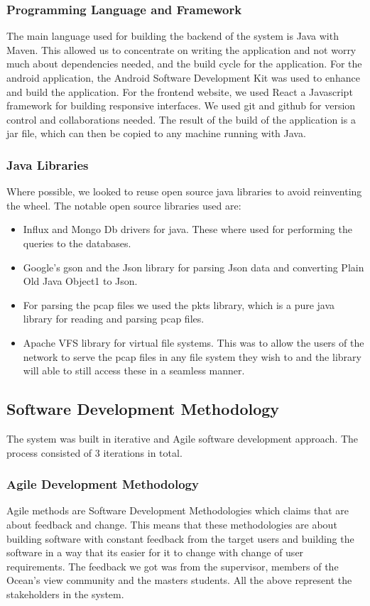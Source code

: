 \subsubsection{Programming Language and Framework}
The main language used for building the backend of the system is Java with Maven.
This allowed us to concentrate on writing the application and not worry much about dependencies needed, and the build cycle for the application.
For the android application, the Android Software Development Kit was used to enhance and build the application.
For the frontend website, we used React a Javascript framework for building responsive interfaces.
We used git and github for version control and collaborations needed.
The result of the build of the application is a jar file, which can then be copied to any machine running with Java.
\subsubsection{Java Libraries}
Where possible, we looked to reuse open source java libraries to avoid reinventing the wheel.
The notable open source libraries used are:
\begin{itemize}
    \item Influx and Mongo Db drivers for java.
    These where used for performing the queries to the databases.
    \item Google's gson and the Json library for parsing Json data and converting Plain Old Java Object1 to Json.
    \item For parsing the pcap files we used the pkts library, which is a pure java library for reading and parsing pcap files.
    \item Apache VFS library for virtual file systems.
    This was to allow the users of the network to serve the pcap files in any file system they wish to and the  library will able to still access these in a seamless manner.
\end{itemize}
\subsection{Software Development Methodology}\label{subsec:software-development-methodology}
The system was built in iterative and Agile software development approach.
The process consisted of 3 iterations in total.
\subsubsection{Agile Development Methodology}
Agile methods are Software Development Methodologies which\cite{1204373} claims that are about feedback and change.
This means that these methodologies are about building software with constant feedback from the target users and building the software in a way that its easier for it to change with change of user requirements.
The feedback we got was from the supervisor, members of the Ocean's view community and the masters students.
All the above represent the stakeholders in the system.
